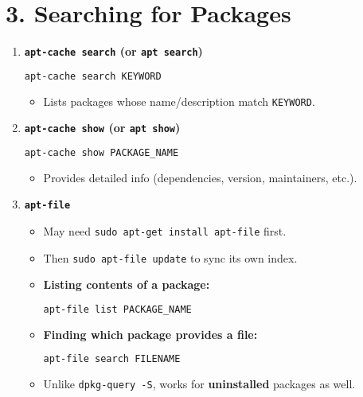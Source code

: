 \documentclass[12pt,a4paper]{report}
\begin{document}
\section*{3. Searching for Packages}

\begin{enumerate}
    \item \textbf{\texttt{apt-cache search} (or \texttt{apt search})}
    \begin{lstlisting}[language=bash]
apt-cache search KEYWORD
    \end{lstlisting}
    \begin{itemize}
        \item Lists packages whose name/description match \texttt{KEYWORD}.
    \end{itemize}

    \item \textbf{\texttt{apt-cache show} (or \texttt{apt show})}
    \begin{lstlisting}[language=bash]
apt-cache show PACKAGE_NAME
    \end{lstlisting}
    \begin{itemize}
        \item Provides detailed info (dependencies, version, maintainers, etc.).
    \end{itemize}

    \item \textbf{\texttt{apt-file}}
    \begin{itemize}
        \item May need \texttt{sudo apt-get install apt-file} first.
        \item Then \texttt{sudo apt-file update} to sync its own index.
    \end{itemize}
    \begin{itemize}
        \item \textbf{Listing contents of a package:}
        \begin{lstlisting}[language=bash]
apt-file list PACKAGE_NAME
        \end{lstlisting}
        \item \textbf{Finding which package provides a file:}
        \begin{lstlisting}[language=bash]
apt-file search FILENAME
        \end{lstlisting}
        \item Unlike \texttt{dpkg-query -S}, works for \textbf{uninstalled} packages as well.
    \end{itemize}
\end{enumerate}
\end{document}
